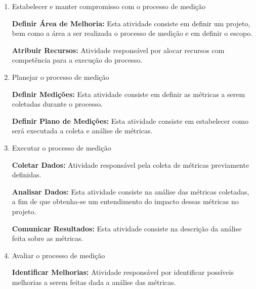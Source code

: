 \begin{enumerate}
\item Estabelecer e manter compromisso com o processo de medição

\textbf{Definir Área de Melhoria:} Esta atividade consiste em definir um projeto, bem como a área a ser realizada o processo de medição e em definir o escopo.

\textbf{Atribuir Recursos:} Atividade responsável por alocar recursos com competência  para a execução do processo.

\item Planejar o processo de medição

\textbf{Definir Medições:} Esta atividade consiste em definir as métricas a serem coletadas durante o processo.

\textbf{Definir Plano de Medições:} Esta atividade consiste em estabelecer como será executada a coleta e análise de métricas.

\item Executar o processo de medição

\textbf{Coletar Dados:} Atividade responsável pela coleta de métricas previamente definidas.

\textbf{Analisar Dados:} Esta atividade consiste na análise das métricas coletadas, a fim de que obtenha-se um entendimento do impacto dessas métricas no projeto.

\textbf{Comunicar Resultados:} Esta atividade consiste na descrição da análise feita sobre as métricas.

\item Avaliar o processo de medição

\textbf{Identificar Melhorias:} Atividade responsável por identificar possíveis melhorias a serem feitas dada a análise das métricas.

\end{enumerate}
